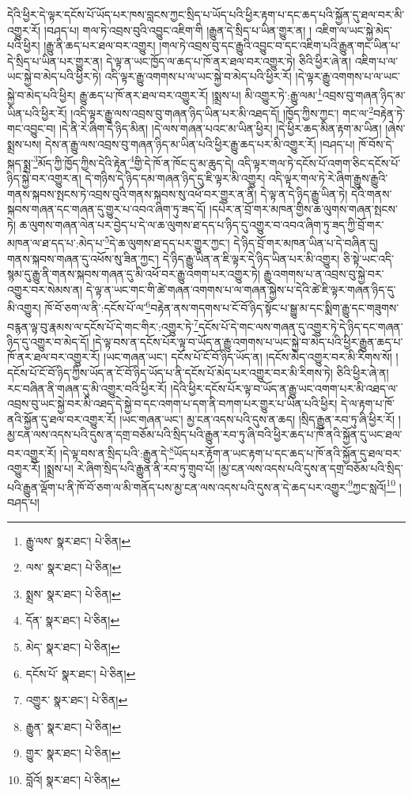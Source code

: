 དེའི་ཕྱིར་དེ་ལྟར་དངོས་པོ་ཡོད་པར་ཁས་བླངས་ཀྱང་སྲིད་པ་ཡོད་པའི་ཕྱིར་རྟག་པ་དང་ཆད་པའི་སྐྱོན་དུ་ཐལ་བར་མི་འགྱུར་རོ། །བཤད་པ། གལ་ཏེ་འབྲས་བུའི་འབྱུང་འཇིག་གི །རྒྱུན་དེ་སྲིད་པ་ཡིན་གྱུར་ན། །
འཇིག་ལ་ཡང་སྐྱེ་མེད་པའི་ཕྱིར། །རྒྱུ་ནི་ཆད་པར་ཐལ་བར་འགྱུར། །གལ་ཏེ་འབྲས་བུ་དང་རྒྱུའི་འབྱུང་བ་དང་འཇིག་པའི་རྒྱུན་གང་ཡིན་པ་དེ་སྲིད་པ་ཡིན་པར་གྱུར་ན། དེ་ལྟ་ན་ཡང་ཁྱོད་ལ་ཆད་པ་ཁོ་ནར་ཐལ་བར་འགྱུར་ཏེ། ཅིའི་ཕྱིར་ཞེ་ན། འཇིག་པ་ལ་ཡང་སྐྱེ་བ་མེད་པའི་ཕྱིར་ཏེ། འདི་ལྟར་རྒྱུ་འགགས་པ་ལ་ཡང་སྐྱེ་བ་མེད་པའི་ཕྱིར་རོ། །དེ་ལྟར་རྒྱུ་འགགས་པ་ལ་ཡང་སྐྱེ་བ་མེད་པའི་ཕྱིར། རྒྱུ་ཆད་པ་ཁོ་ནར་ཐལ་བར་འགྱུར་རོ། །སྨྲས་པ། མི་འགྱུར་ཏེ་:རྒྱུ་ལམ་\footnote{རྒྱུ་ལས་  སྣར་ཐང་།  པེ་ཅིན། }འབྲས་བུ་གཞན་ཉིད་མ་ཡིན་པའི་ཕྱིར་རོ། །འདི་ལྟར་རྒྱུ་ལས་འབྲས་བུ་གཞན་ཉིད་ཡིན་པར་མི་འཐད་དོ། །ཁྱོད་ཀྱིས་ཀྱང་། གང་ལ་\footnote{ལས་  སྣར་ཐང་།  པེ་ཅིན། }བརྟེན་ཏེ་གང་འབྱུང་བ། །དེ་ནི་རེ་ཞིག་དེ་ཉིད་མིན། །དེ་ལས་གཞན་པའང་མ་ཡིན་ཕྱིར། །དེ་ཕྱིར་ཆད་མིན་རྟག་མ་ཡིན། །ཞེས་སྨྲས་པས། དེས་ན་རྒྱུ་ལས་འབྲས་བུ་གཞན་ཉིད་མ་ཡིན་པའི་ཕྱིར་རྒྱུ་ཆད་པར་མི་འགྱུར་རོ། །བཤད་པ། ཁོ་བོས་དེ་སྐད་སྨྲ་\footnote{སྨྲས་  སྣར་ཐང་།  པེ་ཅིན། }མོད་ཀྱི་ཁྱོད་ཀྱིས་དེའི་རྟེན་\footnote{དོན་  སྣར་ཐང་།  པེ་ཅིན། }གྱི་དེ་ཁོ་ན་ཁོང་དུ་མ་ཆུད་དེ། འདི་ལྟར་གལ་ཏེ་དངོས་པོ་འགག་ཅིང་དངོས་པོ་ཉིད་སྐྱེ་བར་འགྱུར་ན། དེ་གཉིས་དེ་ཉིད་དམ་གཞན་ཉིད་དུ་ཇི་ལྟར་མི་འགྱུར། འདི་ལྟར་གལ་ཏེ་རེ་ཞིག་རྒྱུས་རྒྱུའི་གནས་སྐབས་སྤངས་ཏེ་འབྲས་བུའི་གནས་སྐབས་སུ་འཕོ་བར་གྱུར་ན་ནི། དེ་ལྟ་ན་དེ་ཉིད་རྒྱུ་ཡིན་ཏེ། དེའི་གནས་སྐབས་གཞན་དང་གཞན་དུ་གྱུར་པ་འབའ་ཞིག་ཏུ་ཟད་དོ། །དཔེར་ན་བྲོ་གར་མཁན་གྱིས་ཆ་ལུགས་གཞན་སྤངས་ཏེ། ཆ་ལུགས་གཞན་ལེན་པར་བྱེད་པ་དེ་ལ་ཆ་ལུགས་ཐ་དད་པ་ཉིད་དུ་འགྱུར་བ་འབའ་ཞིག་ཏུ་ཟད་ཀྱི་བྲོ་གར་མཁན་ལ་ཐ་དད་པ་:མེད་པ་\footnote{མེད་  སྣར་ཐང་།  པེ་ཅིན། }དེ་ཆ་ལུགས་ཐ་དད་པར་གྱུར་ཀྱང་། དེ་ཉིད་བྲོ་གར་མཁན་ཡིན་པ་དེ་བཞིན་དུ། གནས་སྐབས་གཞན་དུ་འཕོས་སུ་ཟིན་ཀྱང་། དེ་ཉིད་རྒྱུ་ཡིན་ན་ཇི་ལྟར་དེ་ཉིད་ཡིན་པར་མི་འགྱུར། ཅི་སྟེ་ཡང་འདི་སྙམ་དུ་རྒྱུ་ནི་གནས་སྐབས་གཞན་དུ་མི་འཕོ་བར་རྒྱུ་འགག་པར་འགྱུར་ཏེ། རྒྱུ་འགགས་པ་ན་འབྲས་བུ་སྐྱེ་བར་འགྱུར་བར་སེམས་ན། དེ་ལྟ་ན་ཡང་གང་གི་ཚེ་གཞན་འགགས་པ་ལ་གཞན་སྐྱེས་པ་དེའི་ཚེ་ཇི་ལྟར་གཞན་ཉིད་དུ་མི་འགྱུར། ཁོ་བོ་ཅག་ལ་ནི་:དངོས་པོ་ལ་\footnote{དངོས་པོ་  སྣར་ཐང་།  པེ་ཅིན། }བརྟེན་ནས་གདགས་པ་ངོ་བོ་ཉིད་སྟོང་པ་སྒྱུ་མ་དང་སྨིག་རྒྱུ་དང་གཟུགས་བརྙན་ལྟ་བུ་རྣམས་ལ་དངོས་པོ་དེ་གང་གིར་:འགྱུར་ཏེ་\footnote{འགྱུར་  སྣར་ཐང་།  པེ་ཅིན། }དངོས་པོ་དེ་གང་ལས་གཞན་དུ་འགྱུར་ཏེ་དེ་ཉིད་དང་གཞན་ཉིད་དུ་འགྱུར་བ་མེད་དོ། །དེ་ལྟ་བས་ན་དངོས་པོར་ལྟ་བ་ཡོད་ན་རྒྱུ་འགགས་པ་ཡང་སྐྱེ་བ་མེད་པའི་ཕྱིར་རྒྱུན་ཆད་པ་ཁོ་ནར་ཐལ་བར་འགྱུར་རོ། །ཡང་གཞན་ཡང་། དངོས་པོ་ངོ་བོ་ཉིད་ཡོད་ན། །དངོས་མེད་འགྱུར་བར་མི་རིགས་སོ། །དངོས་པོ་ངོ་བོ་ཉིད་ཀྱིས་ཡོད་ན་ངོ་བོ་ཉིད་ཡོད་པ་ནི་དངོས་པོ་མེད་པར་འགྱུར་བར་མི་རིགས་ཏེ། ཅིའི་ཕྱིར་ཞེ་ན། རང་བཞིན་ནི་གཞན་དུ་མི་འགྱུར་བའི་ཕྱིར་རོ། །དེའི་ཕྱིར་དངོས་པོར་ལྟ་བ་ཡོད་ན་རྒྱུ་ཡང་འགག་པར་མི་འཐད་ལ་འབྲས་བུ་ཡང་སྐྱེ་བར་མི་འཐད་དེ་སྐྱེ་བ་དང་འགག་པ་དག་ནི་བཀག་པར་གྱུར་པ་ཡིན་པའི་ཕྱིར། དེ་ལ་རྟག་པ་ཁོ་ནའི་སྐྱོན་དུ་ཐལ་བར་འགྱུར་རོ། །ཡང་གཞན་ཡང་། མྱ་ངན་འདས་པའི་དུས་ན་ཆད། །སྲིད་རྒྱུན་རབ་ཏུ་ཞི་ཕྱིར་རོ། །མྱ་ངན་ལས་འདས་པའི་དུས་ན་དགྲ་བཅོམ་པའི་སྲིད་པའི་རྒྱུན་རབ་ཏུ་ཞི་བའི་ཕྱིར་ཆད་པ་ཁོ་ནའི་སྐྱོན་དུ་ཡང་ཐལ་བར་འགྱུར་རོ། །དེ་ལྟ་བས་ན་སྲིད་པའི་:རྒྱུན་དེ་\footnote{རྒྱུན་  སྣར་ཐང་།  པེ་ཅིན། }ཡོད་པར་རྟོག་ན་ཡང་རྟག་པ་དང་ཆད་པ་ཁོ་ནའི་སྐྱོན་དུ་ཐལ་བར་འགྱུར་རོ། །སྨྲས་པ། རེ་ཞིག་སྲིད་པའི་རྒྱུན་ནི་རབ་ཏུ་གྲུབ་པོ། །མྱ་ངན་ལས་འདས་པའི་དུས་ན་དགྲ་བཅོམ་པའི་སྲིད་པའི་རྒྱུན་ལྡོག་པ་ནི་ཁོ་བོ་ཅག་ལ་མི་གནོད་པས་མྱ་ངན་ལས་འདས་པའི་དུས་ན་དེ་ཆད་པར་འགྱུར་\footnote{གྱུར་  སྣར་ཐང་།  པེ་ཅིན། }ཀྱང་སླའོ།\footnote{བློའོ།  སྣར་ཐང་།  པེ་ཅིན། } །བཤད་པ། 